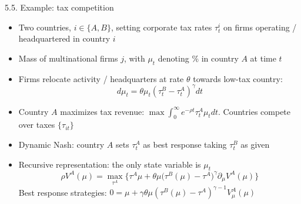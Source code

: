 \documentclass[10pt]{beamer}
\begin{document}
\begin{frame}{5.5. Example: tax competition}
\begin{itemize}
\item Two countries, $i \in \{A, B\}$, setting corporate tax rates $\tau_t^i$ on firms operating / headquartered in country $i$

\item Mass of multinational firms $j$, with $\mu_t$ denoting $\%$ in country $A$ at time $t$

\item Firms relocate activity / headquarters at rate $\theta$ towards low-tax country:
\begin{equation*}
	d \mu_t = \theta \mu_t (\tau_t^B - \tau_t^A)^\gamma dt  
\end{equation*}

\item Country $A$ maximizes tax revenue: $\max \int_0^\infty e^{- \rho t} \tau_t^A \mu_t dt$. Countries compete over taxes $\{ \tau_{it} \}$

\item Dynamic Nash: country $A$ sets $\tau_t^A$ as best response taking $\tau_t^B$ as given 

\item Recursive representation: the only state variable is $\mu_t$
\begin{equation*}
	\rho V^A(\mu) = \max_{\tau^A} \Big\{ \tau^A \mu + \theta \mu \Big( \tau^B(\mu) - \tau^A \Big)^\gamma \partial_\mu V^A(\mu) \Big\}
\end{equation*}
Best response strategies: $0 = \mu + \gamma \theta \mu (\tau^B(\mu) - \tau^A)^{\gamma - 1} V_\mu^A(\mu)$
\end{itemize}
\end{frame}










\appendix
\end{document}
